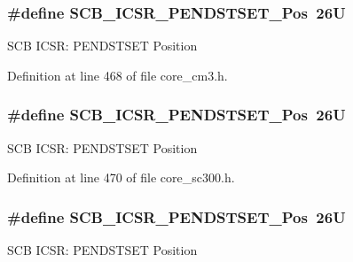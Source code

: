 \subsubsection[{\texorpdfstring{S\+C\+B\+\_\+\+I\+C\+S\+R\+\_\+\+P\+E\+N\+D\+S\+T\+S\+E\+T\+\_\+\+Pos}{SCB_ICSR_PENDSTSET_Pos}}]{\setlength{\rightskip}{0pt plus 5cm}\#define S\+C\+B\+\_\+\+I\+C\+S\+R\+\_\+\+P\+E\+N\+D\+S\+T\+S\+E\+T\+\_\+\+Pos~26U}\hypertarget{group___c_m_s_i_s___s_c_b_ga9dbb3358c6167c9c3f85661b90fb2794}{}\label{group___c_m_s_i_s___s_c_b_ga9dbb3358c6167c9c3f85661b90fb2794}
S\+CB I\+C\+SR\+: P\+E\+N\+D\+S\+T\+S\+ET Position 

Definition at line 468 of file core\+\_\+cm3.\+h.

\subsubsection[{\texorpdfstring{S\+C\+B\+\_\+\+I\+C\+S\+R\+\_\+\+P\+E\+N\+D\+S\+T\+S\+E\+T\+\_\+\+Pos}{SCB_ICSR_PENDSTSET_Pos}}]{\setlength{\rightskip}{0pt plus 5cm}\#define S\+C\+B\+\_\+\+I\+C\+S\+R\+\_\+\+P\+E\+N\+D\+S\+T\+S\+E\+T\+\_\+\+Pos~26U}\hypertarget{group___c_m_s_i_s___s_c_b_ga9dbb3358c6167c9c3f85661b90fb2794}{}\label{group___c_m_s_i_s___s_c_b_ga9dbb3358c6167c9c3f85661b90fb2794}
S\+CB I\+C\+SR\+: P\+E\+N\+D\+S\+T\+S\+ET Position 

Definition at line 470 of file core\+\_\+sc300.\+h.

\subsubsection[{\texorpdfstring{S\+C\+B\+\_\+\+I\+C\+S\+R\+\_\+\+P\+E\+N\+D\+S\+T\+S\+E\+T\+\_\+\+Pos}{SCB_ICSR_PENDSTSET_Pos}}]{\setlength{\rightskip}{0pt plus 5cm}\#define S\+C\+B\+\_\+\+I\+C\+S\+R\+\_\+\+P\+E\+N\+D\+S\+T\+S\+E\+T\+\_\+\+Pos~26U}\hypertarget{group___c_m_s_i_s___s_c_b_ga9dbb3358c6167c9c3f85661b90fb2794}{}\label{group___c_m_s_i_s___s_c_b_ga9dbb3358c6167c9c3f85661b90fb2794}
S\+CB I\+C\+SR\+: P\+E\+N\+D\+S\+T\+S\+ET Position 

